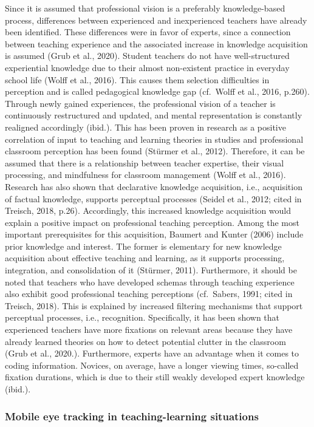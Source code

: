 \documentclass[
  man]{apa6}
\begin{document}
Since it is assumed that professional vision is a preferably knowledge-based process, differences between experienced and inexperienced teachers have already been identified. These differences were in favor of experts, since a connection between teaching experience and the associated increase in knowledge acquisition is assumed (Grub et al., 2020). Student teachers do not have well-structured experiential knowledge due to their almost non-existent practice in everyday school life (Wolff et al., 2016). This causes them selection difficulties in perception and is called pedagogical knowledge gap (cf.~Wolff et al., 2016, p.260). Through newly gained experiences, the professional vision of a teacher is continuously restructured and updated, and mental representation is constantly realigned accordingly (ibid.). This has been proven in research as a positive correlation of input to teaching and learning theories in studies and professional classroom perception has been found (Stürmer et al., 2012). Therefore, it can be assumed that there is a relationship between teacher expertise, their visual processing, and mindfulness for classroom management (Wolff et al., 2016). Research has also shown that declarative knowledge acquisition, i.e., acquisition of factual knowledge, supports perceptual processes (Seidel et al., 2012; cited in Treisch, 2018, p.26). Accordingly, this increased knowledge acquisition would explain a positive impact on professional teaching perception. Among the most important prerequisites for this acquisition, Baumert and Kunter (2006) include prior knowledge and interest. The former is elementary for new knowledge acquisition about effective teaching and learning, as it supports processing, integration, and consolidation of it (Stürmer, 2011). Furthermore, it should be noted that teachers who have developed schemas through teaching experience also exhibit good professional teaching perceptions (cf.~Sabers, 1991; cited in Treisch, 2018). This is explained by increased filtering mechanisms that support perceptual processes, i.e., recognition. Specifically, it has been shown that experienced teachers have more fixations on relevant areas because they have already learned theories on how to detect potential clutter in the classroom (Grub et al., 2020.). Furthermore, experts have an advantage when it comes to coding information. Novices, on average, have a longer viewing times, so-called fixation durations, which is due to their still weakly developed expert knowledge (ibid.).

\hypertarget{mobile-eye-tracking-in-teaching-learning-situations}{%
\subsubsection{Mobile eye tracking in teaching-learning situations}\label{mobile-eye-tracking-in-teaching-learning-situations}}
\end{document}
